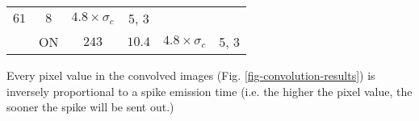 {\begin{table}[htb]
\begin{center}
\begin{tabular}{c c c c c c}
    \begin{minipage}{0.7cm}\centering $61$ \end{minipage}& 
    $8$ & $4.8 \times \sigma_c$ & 5, 3 \\
    \begin{minipage}{0.7cm}\centering 4  \end{minipage} & 
    \begin{minipage}{0.8cm}\centering ON \vspace*{0.005cm}\end{minipage} & 
    \begin{minipage}{0.7cm}\centering $243$\end{minipage} &
    $10.4$ & $4.8 \times \sigma_c$ & 5, 3 
  \end{tabular}
  \egroup
 \end{center}
  \label{tab-kernel-specs}
\end{table}

Every pixel value in the convolved images (Fig. \ref{fig-convolution-results}) 
is inversely proportional to a spike emission time (i.e. the higher the pixel value, the sooner the spike will be sent out.)

}
